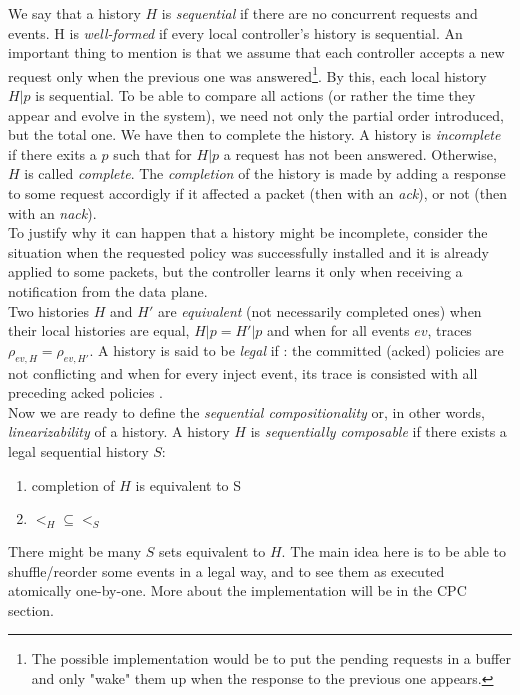 \documentclass{article}
\theoremstyle{remark}
\begin{document}
We say that a history $H$ is \emph{sequential} if there are no concurrent requests and events. H is \emph{well-formed} if every local controller's history is sequential.
An important thing to mention is that we assume that each controller accepts a new request only when the previous one was answered\footnote{The possible implementation would be to put the pending requests in a buffer and only "wake" them up when the response to the previous one appears.}. By this, each local history $H|p$ is sequential.
To be able to compare all actions (or rather the time they appear and evolve in the system), we need not only the partial order introduced, but the total one. We have then to complete the history. A history is \emph{incomplete} if there exits a $p$ such that for $H|p$ a request has not been answered. Otherwise, $H$ is called \emph{complete}. The \emph{completion} of the history is made by adding a response to some request accordigly if it affected a packet (then with an \emph{ack}), or not (then with an \emph{nack}). \\
To justify why it can happen that a history might be incomplete, consider the situation when the requested policy was successfully installed and it is already applied to some packets, but the controller learns it only when receiving a notification from the data plane. \\
Two histories $H$ and $H'$ are \emph{equivalent} (not necessarily completed ones) when their local histories are equal, $H|p=H'|p$ and when for all events $ev$, traces $\rho_{ev,H}=\rho_{ev,H'}$.
A history is said to be \emph{legal} if : the committed (acked) policies are not conflicting and when for every inject event, its trace is consisted with all preceding acked policies \cite{CKLS15}.\\
Now we are ready to define the \emph{sequential compositionality} or, in other words, \emph{linearizability} of a history. A history $H$ is \emph{sequentially composable} if there exists a legal sequential history $S$:
\begin{enumerate}
\item completion of $H$ is equivalent to S
\item $<_H\subseteq <_S$
\end{enumerate}
There might be many $S$ sets equivalent to $H$. The main idea here is to be able to shuffle/reorder some events in a legal way, and to see them as executed atomically one-by-one. More about the implementation  will be in the CPC section.
\end{document}
